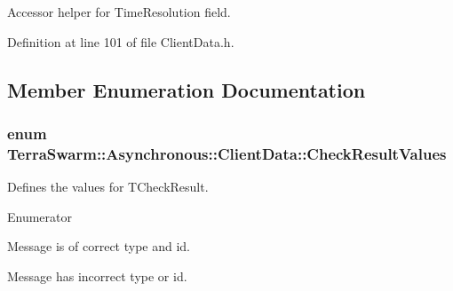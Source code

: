 Accessor helper for Time\-Resolution field. 



Definition at line 101 of file Client\-Data.\-h.



\subsection{Member Enumeration Documentation}
\hypertarget{class_terra_swarm_1_1_asynchronous_1_1_client_data_a4af3124197d375d54989d28c2703dc9f}{
\subsubsection[{Check\-Result\-Values}]{\setlength{\rightskip}{0pt plus 5cm}enum {\bf Terra\-Swarm\-::\-Asynchronous\-::\-Client\-Data\-::\-Check\-Result\-Values}}}\label{class_terra_swarm_1_1_asynchronous_1_1_client_data_a4af3124197d375d54989d28c2703dc9f}


Defines the values for T\-Check\-Result. 

\begin{Desc}
\item[Enumerator]\par
\begin{description}
\item[{\em 
\hypertarget{class_terra_swarm_1_1_asynchronous_1_1_client_data_a4af3124197d375d54989d28c2703dc9fab47acf016a2a1f12737512d9ee7102a0}{Success}\label{class_terra_swarm_1_1_asynchronous_1_1_client_data_a4af3124197d375d54989d28c2703dc9fab47acf016a2a1f12737512d9ee7102a0}
}]Message is of correct type and id. \item[{\em 
\hypertarget{class_terra_swarm_1_1_asynchronous_1_1_client_data_a4af3124197d375d54989d28c2703dc9fa89702b1843b2d2547e4da97c3adca3d0}{Fail}\label{class_terra_swarm_1_1_asynchronous_1_1_client_data_a4af3124197d375d54989d28c2703dc9fa89702b1843b2d2547e4da97c3adca3d0}
}]Message has incorrect type or id. \end{description}
\end{Desc}


